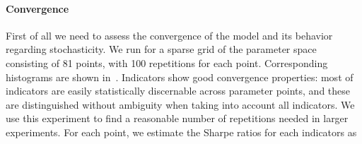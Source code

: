\documentclass[10pt,letterpaper,draft]{article}
\begin{document}
\paragraph{Convergence}

First of all we need to assess the convergence of the model and its behavior regarding stochasticity. We run for a sparse grid of the parameter space consisting of 81 points, with 100 repetitions for each point. Corresponding histograms are shown in~. Indicators show good convergence properties: most of indicators are easily statistically discernable across parameter points, and these are distinguished without ambiguity when taking into account all indicators. We use this experiment to find a reasonable number of repetitions needed in larger experiments. For each point, we estimate the Sharpe ratios for each indicators as 


\end{document}
